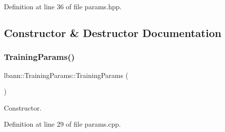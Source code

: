 Definition at line 36 of file params.\+hpp.



\subsection{Constructor \& Destructor Documentation}
\mbox{\label{classlbann_1_1TrainingParams_a4ca5149e14ab1aed5f5a9c0e612ce62d}} 
\subsubsection{\texorpdfstring{Training\+Params()}{TrainingParams()}}
{\footnotesize\ttfamily lbann\+::\+Training\+Params\+::\+Training\+Params (\begin{DoxyParamCaption}{ }\end{DoxyParamCaption})}



Constructor. 



Definition at line 29 of file params.\+cpp.


